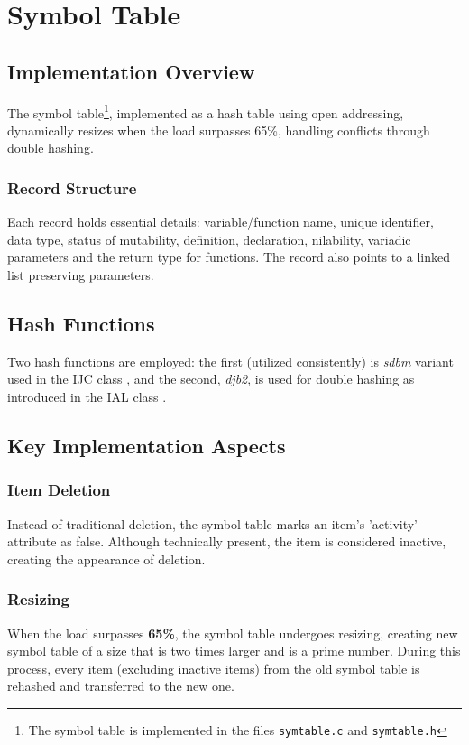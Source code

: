 \section{Symbol Table}
\label{symtable}
\subsection{Implementation Overview}
The symbol table\footnote{The symbol table is implemented in the files \texttt{symtable.c} and \texttt{symtable.h}}, implemented as a hash table using open addressing, dynamically resizes when the load surpasses 65\%, handling conflicts through double hashing.

\subsubsection{Record Structure}
Each record holds essential details: variable/function name, unique identifier, data type, status of mutability, definition, declaration, nilability, variadic parameters  and the return type for functions. The record also points to a linked list preserving parameters.

\subsection{Hash Functions}
Two hash functions are employed: the first (utilized consistently) is \textit{sdbm} variant used in the IJC class \cite{ijc}, and the second, \textit{djb2}, is used for double hashing as introduced in the IAL class \cite{djb2}.

\subsection{Key Implementation Aspects}

\subsubsection{Item Deletion}
Instead of traditional deletion, the symbol table marks an item's 'activity' attribute as false. Although technically present, the item is considered inactive, creating the appearance of deletion.

\subsubsection{Resizing}
When the load surpasses \textbf{65\%}, the symbol table undergoes resizing, creating new symbol table of a size that is two times larger and is a prime number. During this process, every item (excluding inactive items) from the old symbol table is rehashed and transferred to the new one.

